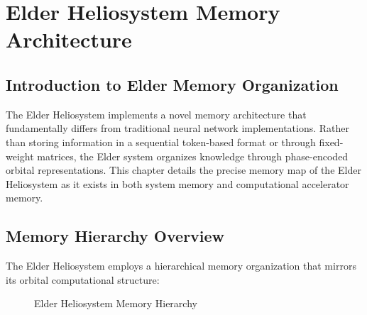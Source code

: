 \chapter{Elder Heliosystem Memory Architecture}

\section{Introduction to Elder Memory Organization}

The Elder Heliosystem implements a novel memory architecture that fundamentally differs from traditional neural network implementations. Rather than storing information in a sequential token-based format or through fixed-weight matrices, the Elder system organizes knowledge through phase-encoded orbital representations. This chapter details the precise memory map of the Elder Heliosystem as it exists in both system memory and computational accelerator memory.

\section{Memory Hierarchy Overview}

The Elder Heliosystem employs a hierarchical memory organization that mirrors its orbital computational structure:

\begin{figure}[h]
\centering
{}
\caption{Elder Heliosystem Memory Hierarchy}
\end{figure}

